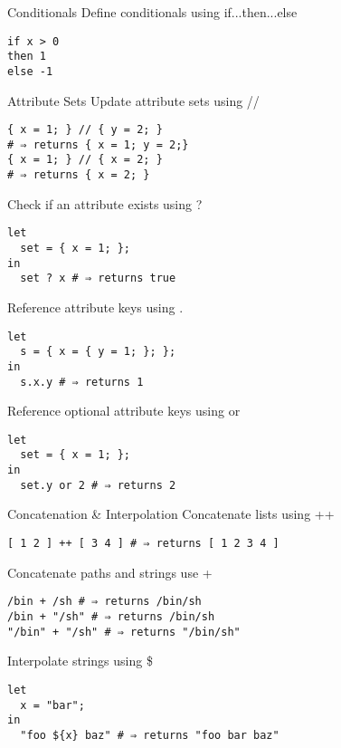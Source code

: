 \documentclass[landscape, 10pt]{article}
\begin{document}
\begin{multicols*}{3}
\begin{ctexpression}{Conditionals}
{\color{nixdarkblue}Define conditionals using} if...then...else
    \begin{verbatim}
if x > 0
then 1
else -1
    \end{verbatim}
\end{ctexpression}

\vfill

\begin{ctexpression}{Attribute Sets}
{\color{nixdarkblue}Update attribute sets using} //
    \begin{verbatim}
{ x = 1; } // { y = 2; }
# ⇒ returns { x = 1; y = 2;}
{ x = 1; } // { x = 2; }
# ⇒ returns { x = 2; }
    \end{verbatim}
    \tcbline
{\color{nixdarkblue}Check if an attribute exists using} ?
    \begin{verbatim}
let
  set = { x = 1; };
in
  set ? x # ⇒ returns true
    \end{verbatim}
    \tcbline
{\color{nixdarkblue}Reference attribute keys using} .
    \begin{verbatim}
let
  s = { x = { y = 1; }; };
in
  s.x.y # ⇒ returns 1
    \end{verbatim}
    \tcbline
{\color{nixdarkblue}Reference optional attribute keys using} or
    \begin{verbatim}
let
  set = { x = 1; };
in
  set.y or 2 # ⇒ returns 2
    \end{verbatim}
\end{ctexpression}

\vfill

\begin{ctexpression}{Concatenation \& Interpolation}
{\color{nixdarkblue}Concatenate lists using} ++
    \begin{verbatim}
[ 1 2 ] ++ [ 3 4 ] # ⇒ returns [ 1 2 3 4 ]
    \end{verbatim}
    \tcbline
{\color{nixdarkblue}Concatenate paths and strings use} +
    \begin{verbatim}
/bin + /sh # ⇒ returns /bin/sh
/bin + "/sh" # ⇒ returns /bin/sh
"/bin" + "/sh" # ⇒ returns "/bin/sh"
    \end{verbatim}
    \tcbline
{\color{nixdarkblue}Interpolate strings using} \$\string{\string}
    \begin{verbatim}
let
  x = "bar";
in
  "foo ${x} baz" # ⇒ returns "foo bar baz"
    \end{verbatim}
\end{ctexpression}


\end{multicols*}
\end{document}
